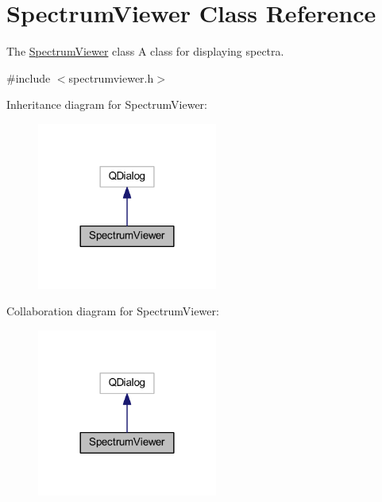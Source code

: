 \hypertarget{class_spectrum_viewer}{\section{Spectrum\+Viewer Class Reference}
\label{class_spectrum_viewer}
}


The \hyperlink{class_spectrum_viewer}{Spectrum\+Viewer} class A class for displaying spectra.  




{\ttfamily \#include $<$spectrumviewer.\+h$>$}



Inheritance diagram for Spectrum\+Viewer\+:\nopagebreak
\begin{figure}[H]
\begin{center}
\leavevmode
\includegraphics[width=168pt]{class_spectrum_viewer__inherit__graph}
\end{center}
\end{figure}


Collaboration diagram for Spectrum\+Viewer\+:\nopagebreak
\begin{figure}[H]
\begin{center}
\leavevmode
\includegraphics[width=168pt]{class_spectrum_viewer__coll__graph}
\end{center}
\end{figure}
